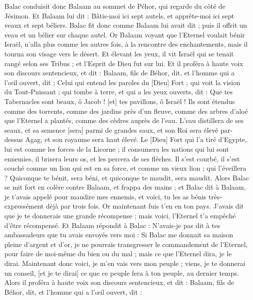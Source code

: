 \begin{multicols}{2}
Balac conduisit donc Balaam au sommet de Péhor, qui regarde du côté de Jésimon.
Et Balaam lui dit : Bâtis-moi ici sept autels, et apprête-moi ici sept veaux et sept béliers.
Balac fit donc comme Balaam lui avait dit ; puis il offrit un veau et un bélier sur chaque autel.
\VerseOne{}Or Balaam voyant que l'Eternel voulait bénir Israël, n'alla plus comme les autres fois, à la rencontre des enchantements, mais il tourna son visage vers le désert.
Et élevant les yeux, il vit Israël qui se tenait rangé selon ses Tribus ; et l'Esprit de Dieu fut sur lui.
Et il proféra à haute voix son discours sentencieux, et dit : Balaam, fils de Béhor, dit, et l'homme qui a l'œil ouvert, dit ;
Celui qui entend les paroles du [Dieu] Fort ; qui voit la vision du Tout-Puissant ; qui tombe à terre, et qui a les yeux ouverts, dit :
Que tes Tabernacles sont beaux, ô Jacob ! [et] tes pavillons, ô Israël !
Ils sont étendus comme des torrents, comme des jardins près d'un fleuve, comme des arbres d'aloé que l'Eternel a plantés, comme des cèdres auprès de l'eau.
L'eau distillera de ses seaux, et sa semence [sera] parmi de grandes eaux, et son Roi sera élevé par-dessus Agag, et son royaume sera haut élevé.
Le [Dieu] Fort qui l'a tiré d'Egypte, lui est comme les forces de la Licorne ; il consumera les nations qui lui sont ennemies, il brisera leurs os, et les percera de ses flèches.
Il s'est courbé, il s'est couché comme un lion qui est en sa force, et comme un vieux lion ; qui l'éveillera ? Quiconque te bénit, sera béni, et quiconque te maudit, sera maudit.
Alors Balac se mit fort en colère contre Balaam, et frappa des mains ; et Balac dit à Balaam, je t'avais appelé pour maudire mes ennemis, et voici, tu les as bénis très-expressément déjà par trois fois.
Or maintenant fuis t'en en ton pays. J'avais dit que je te donnerais une grande récompense ; mais voici, l'Eternel t'a empêché d'être récompensé.
Et Balaam répondit à Balac : N'avais-je pas dit à tes ambassadeurs que tu avais envoyés vers moi :
Si Balac me donnait sa maison pleine d'argent et d'or, je ne pourrais transgresser le commandement de l'Eternel, pour faire de moi-même du bien ou du mal ; mais ce que l'Eternel dira, je le dirai.
Maintenant donc voici, je m'en vais vers mon peuple ; viens, je te donnerai un conseil, [et je te dirai] ce que ce peuple fera à ton peuple, au dernier temps.
Alors il proféra à haute voix son discours sentencieux, et dit : Balaam, fils de Béhor, dit, et l'homme qui a l'œil ouvert, dit :

\end{multicols}
